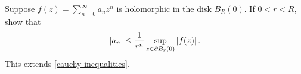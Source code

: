 \documentclass{homework}
\begin{document}
                                                                                                                                                                \begin{problem}\label{cauchy-inequalities-2}Suppose
                                                                                                                                                                  $f(z) = \sum_{n=0}^\infty a_n z^n$ is holomorphic in the disk
                                                                                                                                                                    $B_R(0)$.  If $0 < r < R$, show that
                                                                                                                                                                      \[
                                                                                                                                                                          \left|a_n\right| \leq \frac{1}{r^n} \displaystyle\sup_{z \in \partial B_r(0)} \left|f(z)\right|.
                                                                                                                                                                            \]
                                                                                                                                                                              This extends \ref{cauchy-inequalities}.
                                                                                                                                                                              \end{problem}
\end{document}
